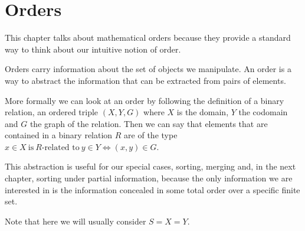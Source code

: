 \section{Orders}

This chapter talks about mathematical orders because they provide a standard
way to think about our intuitive notion of order.

Orders carry information about the set of objects we manipulate. An order is a
way to abstract the information that can be extracted from pairs of elements.

More formally we can look at an order by following the definition of a binary
relation, an ordered triple $(X, Y, G)$ where $X$ is the domain, $Y$ the
codomain and $G$ the graph of the relation.
Then we can say that elements that are contained in a binary relation $R$ are
of the type $x \in X~\text{is}~R\text{-related to}~y \in Y \iff (x, y) \in G$.

This abstraction is useful for our special cases, sorting, merging and, in the
next chapter, sorting under partial information, because the only information
we are interested in is the information concealed in some total order over a
specific finite set.

Note that here we will usually consider \(S = X = Y\).
